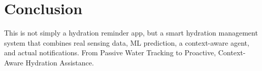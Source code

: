 \documentclass[conference]{IEEEtran}
\begin{document}
\section{Conclusion}

This is not simply a hydration reminder app, but a smart hydration management system that combines real sensing data, ML prediction, a context-aware agent, and actual notifications. From Passive Water Tracking to Proactive, Context-Aware Hydration Assistance.

% 
% 
\end{document}
